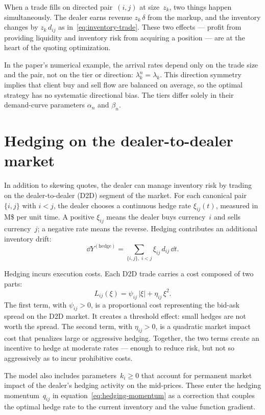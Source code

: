 When a trade fills on directed pair~$(i,j)$ at size~$z_k$, two things happen simultaneously. The dealer earns revenue $z_k\,\delta$ from the markup, and the inventory changes by $z_k\,d_{ij}$ as in~\eqref{eq:inventory-trade}. These two effects --- profit from providing liquidity and inventory risk from acquiring a position --- are at the heart of the quoting optimization.

In the paper's numerical example, the arrival rates depend only on the trade size and the pair, not on the tier or direction: $\lambda^n_k = \lambda_k$. This direction symmetry implies that client buy and sell flow are balanced on average, so the optimal strategy has no systematic directional bias. The tiers differ solely in their demand-curve parameters $\alpha_n$ and $\beta_n$.


\section{Hedging on the dealer-to-dealer market}
\label{sec:model-hedging}

In addition to skewing quotes, the dealer can manage inventory risk by trading on the dealer-to-dealer (D2D) segment of the market. For each canonical pair $\{i,j\}$ with $i < j$, the dealer chooses a continuous hedge rate $\xi_{ij}(t)$, measured in M\$ per unit time. A positive $\xi_{ij}$ means the dealer buys currency~$i$ and sells currency~$j$; a negative rate means the reverse. Hedging contributes an additional inventory drift:
\[
  \dd Y^{(\text{hedge})} = \sum_{\{i,j\},\; i < j} \xi_{ij}\, d_{ij}\, \dd t.
\]

Hedging incurs execution costs. Each D2D trade carries a cost composed of two parts:
\begin{equation}
  \label{eq:execution-cost}
  L_{ij}(\xi) = \psi_{ij}\,|\xi| + \eta_{ij}\,\xi^2.
\end{equation}
The first term, with $\psi_{ij} > 0$, is a proportional cost representing the bid-ask spread on the D2D market. It creates a threshold effect: small hedges are not worth the spread. The second term, with $\eta_{ij} > 0$, is a quadratic market impact cost that penalizes large or aggressive hedging. Together, the two terms create an incentive to hedge at moderate rates --- enough to reduce risk, but not so aggressively as to incur prohibitive costs.

The model also includes parameters~$k_i \geq 0$ that account for permanent market impact of the dealer's hedging activity on the mid-prices. These enter the hedging momentum~$q_{ij}$ in equation~\eqref{eq:hedging-momentum} as a correction that couples the optimal hedge rate to the current inventory and the value function gradient.


